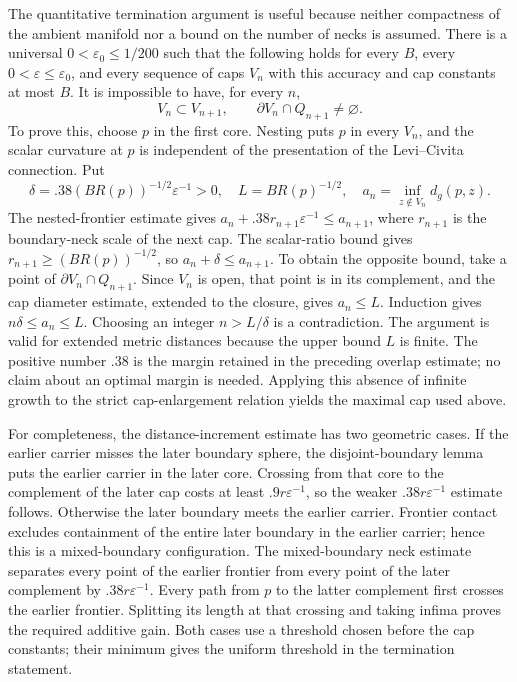 The quantitative termination argument is useful because neither compactness
of the ambient manifold nor a bound on the number of necks is assumed.
There is a universal $0<\varepsilon_0\le1/200$ such that the following holds
for every $B$, every $0<\varepsilon\le\varepsilon_0$, and every sequence of
caps $V_n$ with this accuracy and cap constants at most $B$.  It is impossible
to have, for every $n$,
\[
 V_n\subset V_{n+1},\qquad
 \partial V_n\cap Q_{n+1}\ne\varnothing.
\]
To prove this, choose $p$ in the first core.  Nesting puts $p$ in every $V_n$,
and the scalar curvature at $p$ is independent of the presentation of the
Levi--Civita connection.  Put
\[
 \delta=.38(BR(p))^{-1/2}\varepsilon^{-1}>0,\quad
 L=BR(p)^{-1/2},\quad
 a_n=\inf_{z\notin V_n}d_g(p,z).
\]
The nested-frontier estimate gives
$a_n+.38r_{n+1}\varepsilon^{-1}\le a_{n+1}$, where $r_{n+1}$ is the
boundary-neck scale of the next cap.  The scalar-ratio bound gives
$r_{n+1}\ge(BR(p))^{-1/2}$, so $a_n+\delta\le a_{n+1}$.
To obtain the opposite bound, take a point of
$\partial V_n\cap Q_{n+1}$.  Since $V_n$ is open, that point is in its
complement, and the cap diameter estimate, extended to the closure, gives
$a_n\le L$.  Induction gives $n\delta\le a_n\le L$.  Choosing an integer
$n>L/\delta$ is a contradiction.  The argument is valid for extended metric
distances because the upper bound $L$ is finite.  The positive number $.38$
is the margin retained in the preceding overlap estimate; no claim about an
optimal margin is needed.  Applying this absence of infinite growth to the
strict cap-enlargement relation yields the maximal cap used above.

For completeness, the distance-increment estimate has two geometric cases.
If the earlier carrier misses the later boundary sphere, the disjoint-boundary
lemma puts the earlier carrier in the later core.  Crossing from that core to
the complement of the later cap costs at least $.9r\varepsilon^{-1}$, so the
weaker $.38r\varepsilon^{-1}$ estimate follows.  Otherwise the later boundary
meets the earlier carrier.  Frontier contact excludes containment of the
entire later boundary in the earlier carrier; hence this is a mixed-boundary
configuration.  The mixed-boundary neck estimate separates every point of
the earlier frontier from every point of the later complement by
$.38r\varepsilon^{-1}$.  Every path from $p$ to the latter complement first
crosses the earlier frontier.  Splitting its length at that crossing and
taking infima proves the required additive gain.  Both cases use a threshold
chosen before the cap constants; their minimum gives the uniform threshold
in the termination statement.

